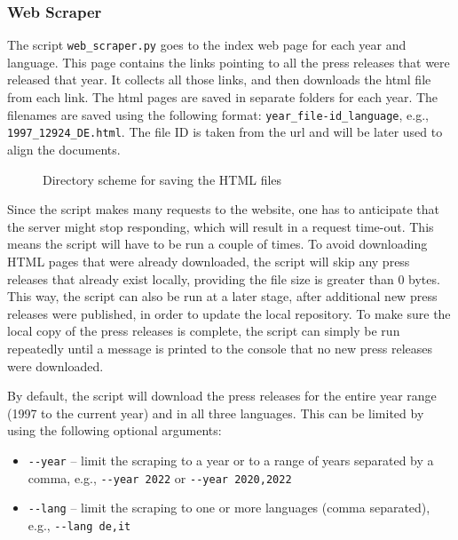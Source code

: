 
\subsubsection{Web Scraper}
\label{subsubsec:web-scraper}
The script \texttt{web\_scraper.py} goes to the index web page for each year and language. 
This page contains the links pointing to all the press releases that were released that year. 
It collects all those links, and then downloads the \acrshort{html} file from each link. 
The \acrshort{html} pages are saved in separate folders for each year. 
The filenames are saved using the following format: \texttt{year\_file-id\_language}, e.g., \texttt{1997\_12924\_DE.html}. 
The file ID is taken from the \gls{url} and will be later used to align the documents. 


\begin{figure}[ht]
\caption{Directory scheme for saving the HTML files}
\label{fig:html-scheme}
\end{figure} 

Since the script makes many requests to the website, one has to anticipate that the server might stop responding, which will result in a request time-out.  This means the script will have to be run a couple of times.
To avoid downloading HTML pages that were already downloaded, the script will skip any press releases that already exist locally, providing the file size is greater than 0 bytes.
This way, the script can also be run at a later stage, after additional new press releases were published, in order to update the local repository.
To make sure the local copy of the press releases is complete, the script can simply be run repeatedly until a message is printed to the console that no new press releases were downloaded. 

By default, the script will download the press releases for the entire year range (1997 to the current year) and in all three languages. 
This can be limited by using the following optional arguments:
\begin{itemize}
	\item \texttt{-{}-year} -- limit the scraping to a year or to a range of years separated by a comma, e.g., \texttt{-{}-year 2022} or \texttt{-{}-year 2020,2022}
	\item \texttt{-{}-lang} -- limit the scraping to one or more languages (comma separated), e.g., \texttt{-{}-lang de,it}
\end{itemize}

